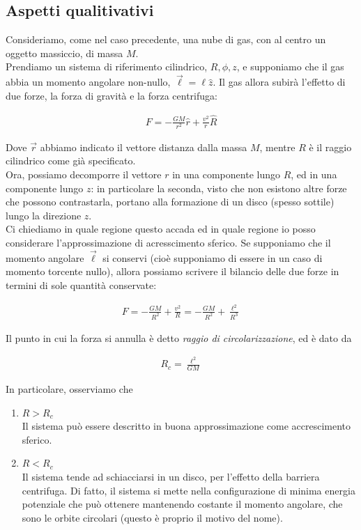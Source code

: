 \documentclass{report}
\begin{document}
\subsection{Aspetti qualitivativi}

Consideriamo, come nel caso precedente, una nube di gas, con al centro un oggetto massiccio, di massa \(M\). \\
Prendiamo un sistema di riferimento cilindrico, \(R, \phi, z\), e supponiamo che il gas abbia un momento angolare non-nullo, \(\vec{\ell} = \ell \hat{z}\). Il gas allora subirà l'effetto di due forze, la forza di gravità e la forza centrifuga: 

\begin{align}
    F = -\frac{GM}{r^2}\hat{r} + \frac{v^2}{r}\hat{R}
\end{align}

Dove \(\vec{r}\) abbiamo indicato il vettore distanza dalla massa \(M\), mentre \(R\) è il raggio cilindrico come già specificato. \\
Ora, possiamo decomporre il vettore \(r\) in una componente lungo \(R\), ed in una componente lungo \(z\): in particolare la seconda, visto che non esistono altre forze che possono contrastarla, portano alla formazione di un disco (spesso sottile) lungo la direzione \(z\). \\

Ci chiediamo in quale regione questo accada ed in quale regione io posso considerare l'approssimazione di acresscimento sferico. Se supponiamo che il momento angolare \(\vec{\ell}\) si conservi (cioè supponiamo di essere in un caso di momento torcente nullo), allora possiamo scrivere il bilancio delle due forze in termini di sole quantità conservate: 

\begin{align}
    F = -\frac{GM}{R^2} + \frac{v^2}{R} = -\frac{GM}{R^2} + \frac{\ell^2}{R^3}
\end{align}

Il punto in cui la forza si annulla è detto \emph{raggio di circolarizzazione}, ed è dato da 

\begin{align}
    R_c = \frac{\ell^2}{GM}
\end{align}

In particolare, osserviamo che 
\begin{enumerate}
    \item \(R > R_c\) \\
    Il sistema può essere descritto in buona approssimazione come accrescimento sferico.
    \item \(R < R_c\) \\
    Il sistema tende ad schiacciarsi in un disco, per l'effetto della barriera centrifuga. Di fatto, il sistema si mette nella configurazione di minima energia potenziale che può ottenere mantenendo costante il momento angolare, che sono le orbite circolari (questo è proprio il motivo del nome). 
\end{enumerate}
\end{document}

